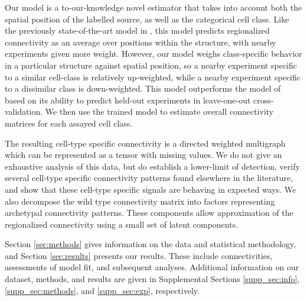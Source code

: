 Our model is a to-our-knowledge novel estimator that takes into account both the spatial position of the labelled source, as well as the categorical cell class.
Like the previously state-of-the-art model in \citet{Knox2019-ot}, this model predicts regionalized connectivity as an average over positions within the structure, with nearby experiments given more weight.
However, our model weighs class-specific behavior in a particular structure against spatial position, so a nearby experiment specific to a similar cell-class is relatively up-weighted, while a nearby experiment specific to a dissimilar class is down-weighted.
This model outperforms the model of  \citet{Knox2019-ot} based on its ability to predict held-out experiments in leave-one-out cross-validation.
We then use the trained model to estimate overall connectivity matrices for each assayed cell class.

The resulting cell-type specific connectivity is a directed weighted multigraph which can be represented as a tensor with missing values.
We do not give an exhaustive analysis of this data, but do establish a lower-limit of detection, verify several cell-type specific connectivity patterns found elsewhere in the literature, and show that these cell-type specific signals are behaving in expected ways.
We also decompose the wild type connectivity matrix into factors representing archetypal connectivity patterns.
These components allow approximation of the regionalized connectivity using a small set of latent components.

Section \ref{sec:methods} gives information on the data and statistical methodology, and Section \ref{sec:results} presents our results.
These include connectivities, assessments of model fit, and subsequent analyses.
Additional information on our dataset, methods, and results are given in Supplemental Sections \ref{supp_sec:info}, \ref{supp_sec:methods}, and \ref{supp_sec:exp}, respectively.
